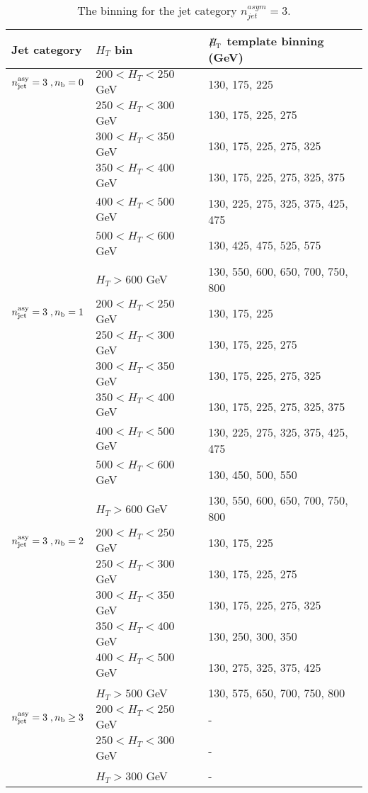 \begin{table}[h!]
  \scriptsize
  \centering
  \caption{The \MHT binning for the jet category $n_{jet}^{asym} = 3$. 
  \label{tab:mhtBins_eq3a}}
  \begin{tabular}{ lll }
    Jet category & $H_{T}$ bin & $\MHT$ template binning (GeV) \\ \hline

    \hline
    $n_{\text{jet}}^{\mathrm{asy}}  =   3 \;, n_{\text{b}} = 0 $ & $200 < H_{T} < 250$ GeV & 130, 175, 225 \\ 
     & $250 < H_{T} < 300$ GeV & 130, 175, 225, 275 \\ 
     & $300 < H_{T} < 350$ GeV & 130, 175, 225, 275, 325 \\ 
     & $350 < H_{T} < 400$ GeV & 130, 175, 225, 275, 325, 375 \\ 
     & $400 < H_{T} < 500$ GeV & 130, 225, 275, 325, 375, 425, 475 \\ 
     & $500 < H_{T} < 600$ GeV & 130, 425, 475, 525, 575 \\ 
     & $H_{T} > 600$ GeV & 130, 550, 600, 650, 700, 750, 800 \\ 
    \hline
    $n_{\text{jet}}^{\mathrm{asy}}  =   3 \;, n_{\text{b}} = 1$ & $200 < H_{T} < 250$ GeV & 130, 175, 225 \\ 
     & $250 < H_{T} < 300$ GeV & 130, 175, 225, 275 \\ 
     & $300 < H_{T} < 350$ GeV & 130, 175, 225, 275, 325 \\ 
     & $350 < H_{T} < 400$ GeV & 130, 175, 225, 275, 325, 375 \\ 
     & $400 < H_{T} < 500$ GeV & 130, 225, 275, 325, 375, 425, 475 \\ 
     & $500 < H_{T} < 600$ GeV & 130, 450, 500, 550 \\ 
     & $H_{T} > 600$ GeV & 130, 550, 600, 650, 700, 750, 800 \\ 
    \hline
    $n_{\text{jet}}^{\mathrm{asy}}  =   3 \;, n_{\text{b}} = 2$ & $200 < H_{T} < 250$ GeV & 130, 175, 225 \\ 
     & $250 < H_{T} < 300$ GeV & 130, 175, 225, 275 \\ 
     & $300 < H_{T} < 350$ GeV & 130, 175, 225, 275, 325 \\ 
     & $350 < H_{T} < 400$ GeV & 130, 250, 300, 350 \\ 
     & $400 < H_{T} < 500$ GeV & 130, 275, 325, 375, 425 \\ 
     & $H_{T} > 500$ GeV & 130, 575, 650, 700, 750, 800 \\ 
    \hline
    $n_{\text{jet}}^{\mathrm{asy}}  =   3 \;, n_{\text{b}} \geq 3$ & $200 < H_{T} < 250$ GeV & - \\ 
     & $250 < H_{T} < 300$ GeV & - \\ 
     & $H_{T} > 300$ GeV & - \\ 

  \end{tabular}
\end{table}



